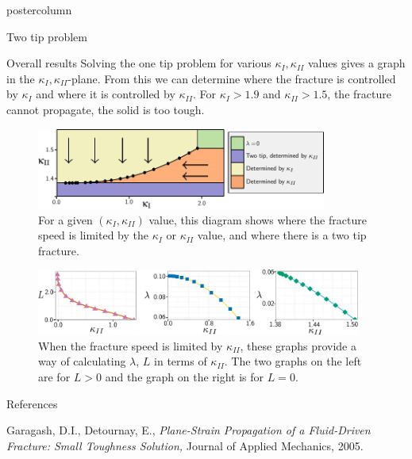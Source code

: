 \documentclass{beamer}
\begin{document}
\begin{frame}
\begin{columns}
\begin{column}{.57\textwidth}
\begin{beamercolorbox}[center]{postercolumn}
\begin{minipage}{.98\textwidth}
{\begin{myblock}{Two tip problem}
\end{myblock}\vfill
\begin{myblock}{Overall results}
Solving the one tip problem for various $\kappa_I,\kappa_{II}$ values gives
a graph in the $\kappa_I , \kappa_{II}$-plane. From this we can determine where
the fracture is controlled by $\kappa_I$ and where it is controlled by
$\kappa_{II}$. For $\kappa_I > 1.9$ and $\kappa_{II} > 1.5$,
the fracture cannot propagate, the solid is too tough.
\begin{figure}
\centering\includegraphics[width=0.85\textwidth]{catagory-poster.pdf}
\caption{For a given $(\kappa_I, \kappa_{II})$ value, this diagram shows where
         the fracture speed is limited by the $\kappa_I$ or $\kappa_{II}$ value,
         and where there is a two tip fracture.}\label{fig:catagory}
\end{figure}
\begin{figure}
\centering\includegraphics[width=0.95\textwidth]{overall-fit-poster.pdf}
\caption{When the fracture speed is limited by $\kappa_{II}$, these graphs
         provide a way of calculating $\lambda$, $L$ in terms of $\kappa_{II}$.
         The two graphs on the left are for $L>0$ and the graph on the right is
         for $L=0$.}
\end{figure}
\end{myblock}\vfill
\begin{myblock}{References}
\footnotesize
\begin{thebibliography}{9}  
%
Garagash, D.I., Detournay, E.,
\emph{Plane-Strain Propagation of a Fluid-Driven Fracture: Small Toughness
Solution,}
Journal of Applied Mechanics,
2005.
%
%
\end{thebibliography}
%
%
\end{myblock}\vfill
}\end{minipage}\end{beamercolorbox}
\end{column}
\end{columns}
\end{frame}
\end{document}
